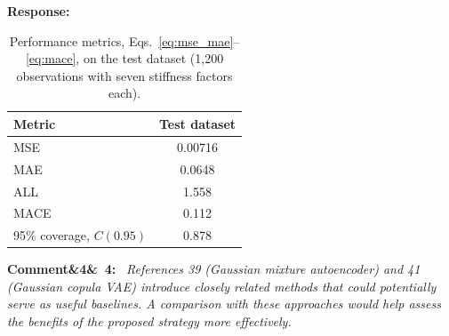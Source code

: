 \documentclass[11pt]{article}
\newenvironment{rcomment}[1]{\par\bigskip\noindent\textbf{Comment\ifx&#1&\else\ #1\fi:}\ \itshape}{\par}
\newenvironment{response}{\par\smallskip\noindent\color{resp}\textbf{Response:}\ }{\par}
\begin{document}
\begin{response}
	\begin{table}[H]
		\centering\small
		\caption{Performance metrics, Eqs.~\eqref{eq:mse_mae}--\eqref{eq:mace}, on the test dataset (1,200 observations with seven stiffness factors each).}
		\label{tab:metricsB}
		\begin{tabular}{lc}
			\toprule
			Metric & Test dataset \\
			\midrule
			MSE & 0.00716 \\
			MAE & 0.0648 \\
			ALL & 1.558 \\
			MACE & 0.112 \\
			95\% coverage, $C(0.95)$ & 0.878 \\
			\bottomrule
		\end{tabular}
	\end{table}
\end{response}


%

\begin{rcomment}{4}
References 39 (Gaussian mixture autoencoder) and 41 (Gaussian copula VAE) introduce closely related methods that could
potentially serve as useful baselines. A comparison with these approaches would help assess the benefits of the proposed
strategy more effectively.
\end{rcomment}
\end{document}
